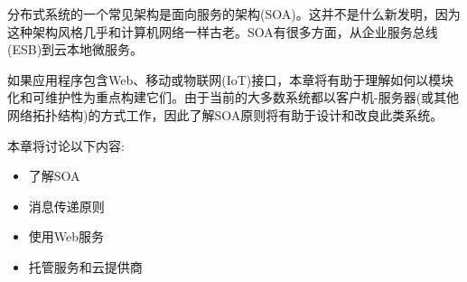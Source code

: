 
分布式系统的一个常见架构是面向服务的架构(SOA)。这并不是什么新发明，因为这种架构风格几乎和计算机网络一样古老。SOA有很多方面，从企业服务总线(ESB)到云本地微服务。

如果应用程序包含Web、移动或物联网(IoT)接口，本章将有助于理解如何以模块化和可维护性为重点构建它们。由于当前的大多数系统都以客户机-服务器(或其他网络拓扑结构)的方式工作，因此了解SOA原则将有助于设计和改良此类系统。

本章将讨论以下内容:

\begin{itemize}
\item 
了解SOA

\item 
消息传递原则

\item 
使用Web服务

\item 
托管服务和云提供商 
\end{itemize}